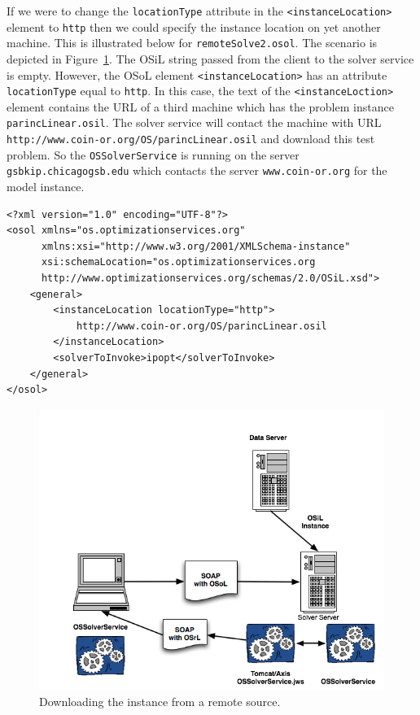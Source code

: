 \documentclass[11pt]{article}
\newcommand{\figurepath}{./figures}
\newcounter{Fig}
\renewcommand{\_}{{\char"5F}}
\renewcommand{\{}{{\char"7B}}
\renewcommand{\}}{{\char"7D}}
\renewcommand{\^}{{\char"0D}}
\renewcommand{\'}{{\char"0D}}
\newcommand{\UrlParinclinear}{http://www.coin-or.org/OS/parincLinear.osil}
\begin{document}
\begin{enumerate}[Step 1:]
If we were to change the {\tt locationType} attribute in the {\tt <instanceLocation>} element to {\tt http} then we
could specify the instance location on yet another machine. This is illustrated below  for {\tt remoteSolve2.osol}.
The scenario is depicted in Figure~\ref{figure:ossolverservice2}.  The OSiL string passed from the client to the solver
service is empty.  However, the OSoL element {\tt <instanceLocation>}  has an attribute {\tt locationType} equal to
{\tt http}.  In this case, the text of the {\tt <instanceLoction>} element contains the URL of a third machine which
has the problem instance {\tt parincLinear.osil}.  The solver service will contact the machine with URL
{\tt\UrlParinclinear} and download this test problem. So the {\tt OSSolverService} is
running on the server {\tt gsbkip.chicagogsb.edu} which contacts the server {\tt www.coin-or.org} for the model instance.
\begin{verbatim}
<?xml version="1.0" encoding="UTF-8"?>
<osol xmlns="os.optimizationservices.org"
      xmlns:xsi="http://www.w3.org/2001/XMLSchema-instance"
      xsi:schemaLocation="os.optimizationservices.org
      http://www.optimizationservices.org/schemas/2.0/OSiL.xsd">
    <general>
        <instanceLocation locationType="http">
            http://www.coin-or.org/OS/parincLinear.osil
        </instanceLocation>
        <solverToInvoke>ipopt</solverToInvoke>      
    </general>
</osol>
\end{verbatim}

\begin{figure}
\centering
\includegraphics[scale=0.5]{./figures/OSSolverService2.png}
\caption{Downloading the instance from a remote source.}
\label{figure:ossolverservice2}
\end{figure}


\end{enumerate}
\end{document}
